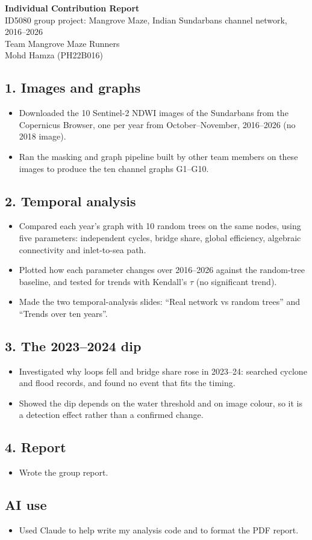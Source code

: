\documentclass[11pt,a4paper]{article}
\begin{document}
{\LARGE\bfseries Individual Contribution Report}\\[4pt]
{\color[gray]{0.35} ID5080 group project: Mangrove Maze, Indian Sundarbans channel network, 2016--2026\\
Team Mangrove Maze Runners\\
Mohd Hamza (PH22B016)}

\subsection*{1. Images and graphs}
\begin{itemize}
  \item Downloaded the 10 Sentinel-2 NDWI images of the Sundarbans from the Copernicus Browser, one per year from October--November, 2016--2026 (no 2018 image).
  \item Ran the masking and graph pipeline built by other team members on these images to produce the ten channel graphs G1--G10.
\end{itemize}

\subsection*{2. Temporal analysis}
\begin{itemize}
  \item Compared each year's graph with 10 random trees on the same nodes, using five parameters: independent cycles, bridge share, global efficiency, algebraic connectivity and inlet-to-sea path.
  \item Plotted how each parameter changes over 2016--2026 against the random-tree baseline, and tested for trends with Kendall's $\tau$ (no significant trend).
  \item Made the two temporal-analysis slides: ``Real network vs random trees'' and ``Trends over ten years''.
\end{itemize}

\subsection*{3. The 2023--2024 dip}
\begin{itemize}
  \item Investigated why loops fell and bridge share rose in 2023--24: searched cyclone and flood records, and found no event that fits the timing.
  \item Showed the dip depends on the water threshold and on image colour, so it is a detection effect rather than a confirmed change.
\end{itemize}

\subsection*{4. Report}
\begin{itemize}
  \item Wrote the group report.
\end{itemize}

\subsection*{AI use}
\begin{itemize}
  \item Used Claude to help write my analysis code and to format the PDF report.
\end{itemize}
\end{document}
